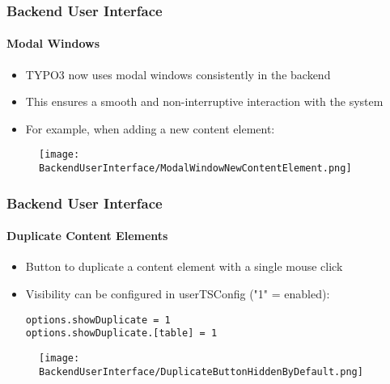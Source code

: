 \begin{frame}[fragile]
	\frametitle{Backend User Interface}
	\framesubtitle{Modal Windows}

	\begin{itemize}
		\item TYPO3 now uses modal windows consistently in the backend
		\item This ensures a smooth and non-interruptive interaction with the system
		\item For example, when adding a new content element:
	\end{itemize}

	\begin{figure}
		\texttt{[image: BackendUserInterface/ModalWindowNewContentElement.png]}
	\end{figure}

\end{frame}


\begin{frame}[fragile]
	\frametitle{Backend User Interface}
	\framesubtitle{Duplicate Content Elements}

	\lstset{basicstyle=\smaller\ttfamily}

	\begin{itemize}
		\item Button to duplicate a content element with a single mouse click
		\item Visibility can be configured in userTSConfig ("1" = enabled):

\begin{lstlisting}
options.showDuplicate = 1
options.showDuplicate.[table] = 1
\end{lstlisting}

	\end{itemize}
	\vspace{-0.5cm}
	\begin{figure}
		\texttt{[image: BackendUserInterface/DuplicateButtonHiddenByDefault.png]}
	\end{figure}

\end{frame}


